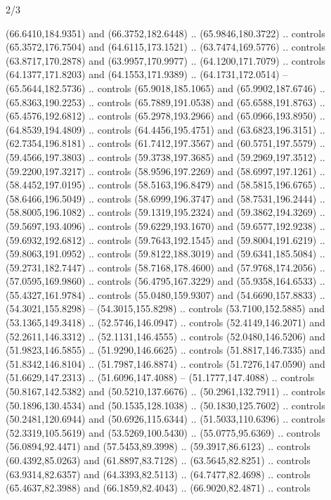 \begin{flagdescription}{2/3}
\begin{scope}[shift={(0.5\flaglength,0.5)},scale=\flagwidth/320]
\begin{scope}[y=0.8pt, x=0.8pt, yscale=-1,shift={(-118.3,-146)}]
  (66.6410,184.9351) and (66.3752,182.6448) .. (65.9846,180.3722) .. controls
  (65.3572,176.7504) and (64.6115,173.1521) .. (63.7474,169.5776) .. controls
  (63.8717,170.2878) and (63.9957,170.9977) .. (64.1200,171.7079) .. controls
  (64.1377,171.8203) and (64.1553,171.9389) .. (64.1731,172.0514) --
  (65.5644,182.5736) .. controls (65.9018,185.1065) and (65.9902,187.6746) ..
  (65.8363,190.2253) .. controls (65.7889,191.0538) and (65.6588,191.8763) ..
  (65.4576,192.6812) .. controls (65.2978,193.2966) and (65.0966,193.8950) ..
  (64.8539,194.4809) .. controls (64.4456,195.4751) and (63.6823,196.3151) ..
  (62.7354,196.8181) .. controls (61.7412,197.3567) and (60.5751,197.5579) ..
  (59.4566,197.3803) .. controls (59.3738,197.3685) and (59.2969,197.3512) ..
  (59.2200,197.3217) .. controls (58.9596,197.2269) and (58.6997,197.1261) ..
  (58.4452,197.0195) .. controls (58.5163,196.8479) and (58.5815,196.6765) ..
  (58.6466,196.5049) .. controls (58.6999,196.3747) and (58.7531,196.2444) ..
  (58.8005,196.1082) .. controls (59.1319,195.2324) and (59.3862,194.3269) ..
  (59.5697,193.4096) .. controls (59.6229,193.1670) and (59.6577,192.9238) ..
  (59.6932,192.6812) .. controls (59.7643,192.1545) and (59.8004,191.6219) ..
  (59.8063,191.0952) .. controls (59.8122,188.3019) and (59.6341,185.5084) ..
  (59.2731,182.7447) .. controls (58.7168,178.4600) and (57.9768,174.2056) ..
  (57.0595,169.9860) .. controls (56.4795,167.3229) and (55.9358,164.6533) ..
  (55.4327,161.9784) .. controls (55.0480,159.9307) and (54.6690,157.8833) ..
  (54.3021,155.8298) -- (54.3015,155.8298) .. controls (53.7100,152.5885) and
  (53.1365,149.3418) .. (52.5746,146.0947) .. controls (52.4149,146.2071) and
  (52.2611,146.3312) .. (52.1131,146.4555) .. controls (52.0480,146.5206) and
  (51.9823,146.5855) .. (51.9290,146.6625) .. controls (51.8817,146.7335) and
  (51.8342,146.8104) .. (51.7987,146.8874) .. controls (51.7276,147.0590) and
  (51.6629,147.2313) .. (51.6096,147.4088) -- (51.1777,147.4088) .. controls
  (50.8167,142.5382) and (50.5210,137.6676) .. (50.2961,132.7911) .. controls
  (50.1896,130.4534) and (50.1535,128.1038) .. (50.1830,125.7602) .. controls
  (50.2481,120.6944) and (50.6926,115.6344) .. (51.5033,110.6396) .. controls
  (52.3319,105.5619) and (53.5269,100.5430) .. (55.0775,95.6369) .. controls
  (56.0894,92.4471) and (57.5453,89.3998) .. (59.3917,86.6123) .. controls
  (60.4392,85.0263) and (61.8897,83.7128) .. (63.5645,82.8251) .. controls
  (63.9314,82.6357) and (64.3393,82.5113) .. (64.7477,82.4698) .. controls
  (65.4637,82.3988) and (66.1859,82.4043) .. (66.9020,82.4871) .. controls

\end{scope}
\end{scope}
\end{flagdescription}
